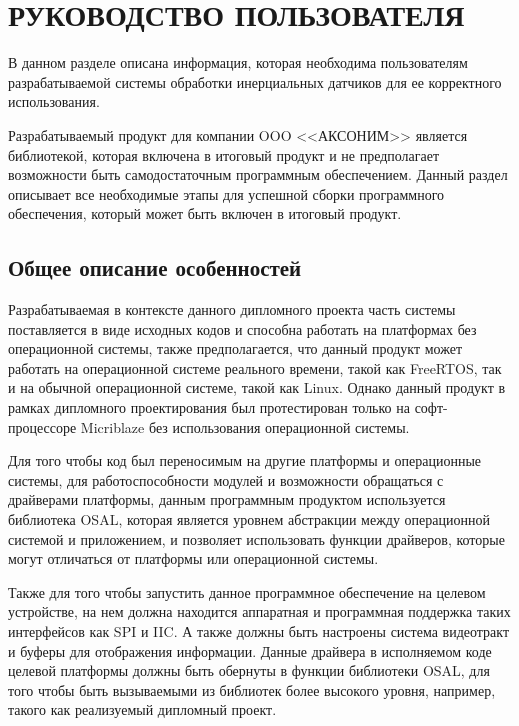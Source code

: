 \section{РУКОВОДСТВО ПОЛЬЗОВАТЕЛЯ}
\label{sec:manual}

В данном разделе описана информация, которая необходима пользователям
разрабатываемой системы обработки инерциальных датчиков для ее корректного использования.

Разрабатываемый продукт для компании OOO <<АКСОНИМ>> является библиотекой, которая включена
в итоговый продукт и не предполагает возможности быть самодостаточным программным обеспечением.
Данный раздел описывает все необходимые этапы для успешной сборки программного обеспечения, который может быть включен
в итоговый продукт.

\subsection{Общее описание особенностей}

Разрабатываемая в контексте данного дипломного проекта
часть системы поставляется в виде исходных кодов и способна работать
на платформах без операционной системы, также предполагается, что данный продукт может работать
на операционной системе реального времени, такой как FreeRTOS, так и
на обычной операционной системе, такой как Linux. Однако данный продукт в рамках дипломного проектирования был
протестирован только на софт-процессоре Micriblaze без использования операционной системы.

Для того чтобы код был переносимым на другие платформы и операционные системы, для работоспособности модулей
и возможности обращаться с драйверами платформы, данным программным продуктом используется библиотека OSAL, которая
является уровнем абстракции между операционной системой и приложением, и позволяет использовать функции драйверов, которые
могут отличаться от платформы или операционной системы.

Также для того чтобы запустить данное программное обеспечение на целевом устройстве, на нем должна находится аппаратная и программная поддержка таких интерфейсов
как SPI и IIC. А также должны быть настроены система видеотракт и буферы для отображения информации. Данные драйвера в исполняемом коде целевой платформы должны быть
обернуты в функции библиотеки OSAL, для того чтобы быть вызываемыми из библиотек более высокого уровня, например, такого как реализуемый дипломный проект.


